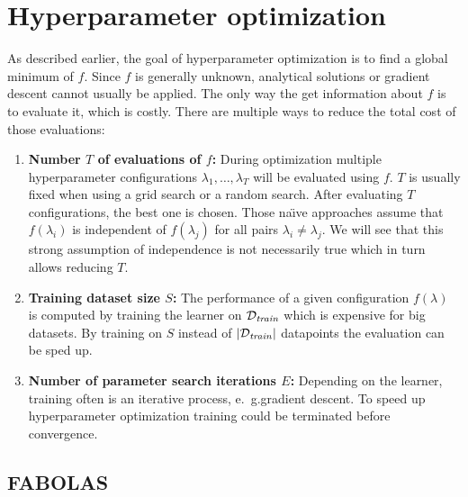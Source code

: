 
\section{Hyperparameter optimization}%
\label{sec:hyperparams}

As described earlier, the goal of hyperparameter optimization is to find a global minimum of \(f\).
Since \(f\) is generally unknown, analytical solutions or gradient descent cannot usually be applied.
The only way the get information about \(f\) is to evaluate it, which is costly.
There are multiple ways to reduce the total cost of those evaluations:
\begin{enumerate}
	\item \textbf{Number \(T\) of evaluations of \(f\):}
		During optimization multiple hyperparameter configurations \(\lambda_1, \dots, \lambda_T\) will be evaluated using \(f\).
		\(T\) is usually fixed when using a grid search or a random search.
		After evaluating \(T\) configurations, the best one is chosen.
		Those na{\"\i}ve approaches assume that \(f(\lambda_i)\) is independent of \(f(\lambda_j)\) for all pairs \(\lambda_i \neq \lambda_j\).
		We will see that this strong assumption of independence is not necessarily true which in turn allows reducing \(T\).
	\item \textbf{Training dataset size \(S\):}
		The performance of a given configuration \(f(\lambda)\) is computed by training the learner on \(\mathcal{D}_{\mathit{train}}\) which is expensive for big datasets.
		By training on \(S\) instead of \(|\mathcal{D}_{\mathit{train}}|\) datapoints the evaluation can be sped up.
	\item \textbf{Number of parameter search iterations \(E\):}
		Depending on the learner, training often is an iterative process, e.~g.\@ gradient descent.
		To speed up hyperparameter optimization training could be terminated before convergence.
\end{enumerate}

\subsection{FABOLAS}%
\label{sec:hyperparams:fabolas}

